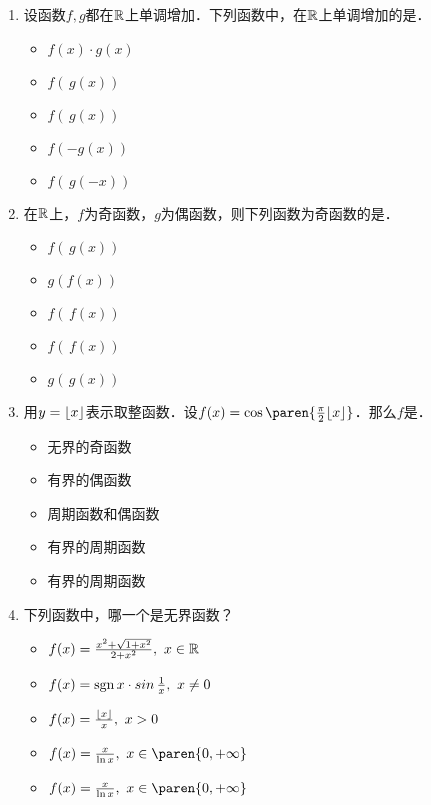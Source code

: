 \begin{enumerate}
\item 设函数\(f, g\)都在\(\mathbb{R}\)上单调增加．下列函数中，在\(\mathbb{R}\)上单调增加的是\uline{\makebox[3em]{}}．
  \begin{itemize}
    \renewcommand{\labelitemi}{\faCircleThin}
  \item \(f(x) \cdot g(x)\)
    \ifshowsol
  \item[\faCircle] \(f(\,g(x))\)
    \else
  \item \(f(\,g(x))\)
    \fi
  \item \(f(-g(x))\)
  \item \(f(\,g(-x))\)
  \end{itemize}

\item 在\(\mathbb{R}\)上，\(f\)为奇函数，\(g\)为偶函数，则下列函数为奇函数的是\uline{\makebox[3em]{}}．
  \begin{itemize}
    \renewcommand{\labelitemi}{\faCircleThin}
  \item \(f(\,g(x))\)
  \item \(g(f(x))\)
    \ifshowsol
  \item[\faCircle] \(f(\,f(x))\)
    \else
  \item \(f(\,f(x))\)
    \fi
  \item \(g(\,g(x))\)
  \end{itemize}

\item 用\(y = \lfloor x\rfloor\)表示取整函数．设\(f(x) = \cos\paren{\frac\pi2 \floor x}\)．那么\(f\)是\uline{\makebox[4em]{}}．
  \begin{itemize}
    \renewcommand{\labelitemi}{\faCircleThin}
  \item 无界的奇函数
  \item 有界的偶函数
  \item 周期函数和偶函数
    \ifshowsol
  \item[\faCircle] 有界的周期函数
    \else
  \item 有界的周期函数
    \fi
  \end{itemize}

\item 下列函数中，哪一个是无界函数？
  \begin{itemize}
    \renewcommand{\labelitemi}{\faCircleThin}
  \item \(f(x) = \frac{x^2 + \sqrt{1+x^2}}{2 + x^2},\ x \in \mathbb{R}\)
  \item \(f(x) = \operatorname{sgn} x \cdot \operatorname{\smash{sin}} \frac1x,\ x \ne 0\)
  \item \(f(x) = \frac{\lfloor x\rfloor}{x},\ x > 0\)
    \ifshowsol
  \item[\faCircle] \(f(x) = \frac{x}{\ln x},\ x \in \paren{0,+\infty}\)
    \else
  \item \(f(x) = \frac{x}{\ln x},\ x \in \paren{0,+\infty}\)
    \fi
  \end{itemize}


\end{enumerate}
